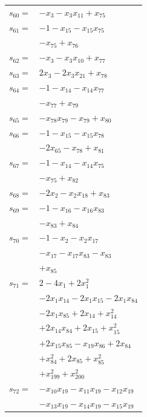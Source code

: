 \begin{longtable}{@{}r@{\;}l@{}}
\(s_{60}=\) & \(\displaystyle -x_{3} -x_{3}x_{11} +x_{75}\) \\[3pt]
\(s_{61}=\) & \(\displaystyle -1 -x_{15} -x_{15}x_{75}\) \\
 & \(\displaystyle -x_{75} +x_{76}\) \\[3pt]
\(s_{62}=\) & \(\displaystyle -x_{3} -x_{3}x_{10} +x_{77}\) \\[3pt]
\(s_{63}=\) & \(\displaystyle 2x_{3} -2x_{3}x_{21} +x_{78}\) \\[3pt]
\(s_{64}=\) & \(\displaystyle -1 -x_{14} -x_{14}x_{77}\) \\
 & \(\displaystyle -x_{77} +x_{79}\) \\[3pt]
\(s_{65}=\) & \(\displaystyle -x_{78}x_{79} -x_{79} +x_{80}\) \\[3pt]
\(s_{66}=\) & \(\displaystyle -1 -x_{15} -x_{15}x_{78}\) \\
 & \(\displaystyle -2x_{65} -x_{78} +x_{81}\) \\[3pt]
\(s_{67}=\) & \(\displaystyle -1 -x_{14} -x_{14}x_{75}\) \\
 & \(\displaystyle -x_{75} +x_{82}\) \\[3pt]
\(s_{68}=\) & \(\displaystyle -2x_{2} -x_{2}x_{18} +x_{83}\) \\[3pt]
\(s_{69}=\) & \(\displaystyle -1 -x_{16} -x_{16}x_{83}\) \\
 & \(\displaystyle -x_{83} +x_{84}\) \\[3pt]
\(s_{70}=\) & \(\displaystyle -1 -x_{2} -x_{2}x_{17}\) \\
 & \(\displaystyle -x_{17} -x_{17}x_{83} -x_{83}\) \\
 & \(\displaystyle +x_{85}\) \\[3pt]
\(s_{71}=\) & \(\displaystyle 2 -4x_{1} +2x_{1}^{2}\) \\
 & \(\displaystyle -2x_{1}x_{14} -2x_{1}x_{15} -2x_{1}x_{84}\) \\
 & \(\displaystyle -2x_{1}x_{85} +2x_{14} +x_{14}^{2}\) \\
 & \(\displaystyle +2x_{14}x_{84} +2x_{15} +x_{15}^{2}\) \\
 & \(\displaystyle +2x_{15}x_{85} -x_{19}x_{86} +2x_{84}\) \\
 & \(\displaystyle +x_{84}^{2} +2x_{85} +x_{85}^{2}\) \\
 & \(\displaystyle +x_{199}^{2} +x_{200}^{2}\) \\[3pt]
\(s_{72}=\) & \(\displaystyle -x_{10}x_{19} -x_{11}x_{19} -x_{12}x_{19}\) \\
 & \(\displaystyle -x_{13}x_{19} -x_{14}x_{19} -x_{15}x_{19}\) \\

\end{longtable}
